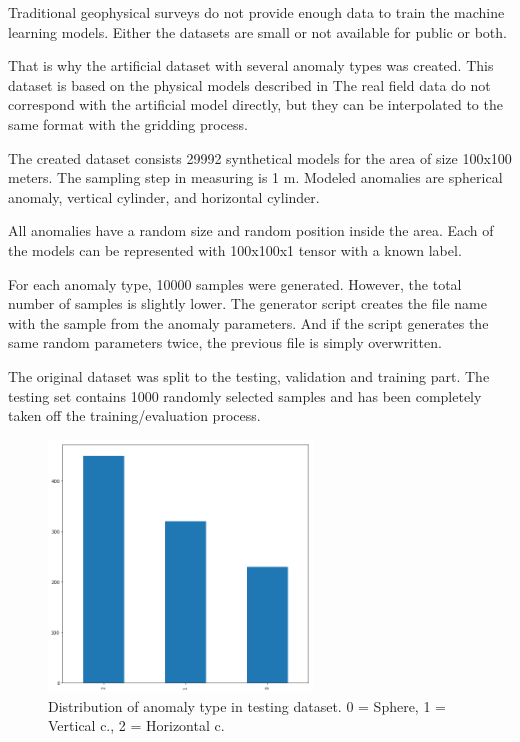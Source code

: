 \documentclass{article}
\begin{document}
Traditional geophysical surveys do not provide enough data to train the
machine learning models. Either the datasets are small or not available
for public or both.

That is why the artificial dataset with several anomaly types was
created. This dataset is based on the physical models described in \cite{salem}
The real field data do not correspond with the artificial model
directly, but they can be interpolated to the same format with the
gridding process.

The created dataset consists 29992 synthetical models for the area of
size 100x100 meters. The sampling step in measuring is 1 m. Modeled
anomalies are spherical anomaly, vertical cylinder, and horizontal
cylinder.

All anomalies have a random size and random position inside the area.
Each of the models can be represented with 100x100x1 tensor with a known
label.

For each anomaly type, 10000 samples were generated. However, the total
number of samples is slightly lower. The generator script creates the
file name with the sample from the anomaly parameters. And if the script
generates the same random parameters twice, the previous file is simply
overwritten.

The original dataset was split to the testing, validation and training
part. The testing set contains 1000 randomly selected samples and has
been completely taken off the training/evaluation process.

\begin{figure}[!htp]
\centerline{\includegraphics[width=7cm]{img/test_set_frequency.png}}
\renewcommand{\figurename}{Figure}
\caption[Distribution of anomaly type in testing dataset. 0 =
Sphere, 1 = Vertical c., 2 = Horizontal c.]{Distribution of anomaly type in testing dataset. 0 =
Sphere, 1 = Vertical c., 2 = Horizontal c.}
\label{fig:SphericalAnomalyDefinition}
\end{figure}
\end{document}
